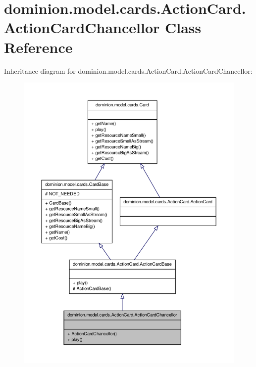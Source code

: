 \hypertarget{classdominion_1_1model_1_1cards_1_1ActionCard_1_1ActionCardChancellor}{\section{dominion.\-model.\-cards.\-Action\-Card.\-Action\-Card\-Chancellor \-Class \-Reference}
\label{classdominion_1_1model_1_1cards_1_1ActionCard_1_1ActionCardChancellor}
}


\-Inheritance diagram for dominion.\-model.\-cards.\-Action\-Card.\-Action\-Card\-Chancellor\-:
\nopagebreak
\begin{figure}[H]
\begin{center}
\leavevmode
\includegraphics[width=350pt]{classdominion_1_1model_1_1cards_1_1ActionCard_1_1ActionCardChancellor__inherit__graph}
\end{center}
\end{figure}


